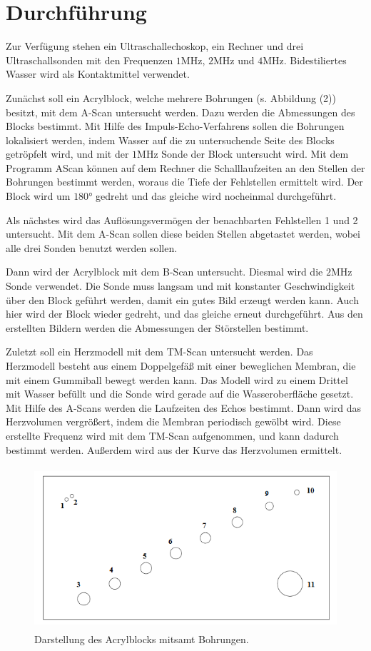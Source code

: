 \section{Durchführung}
\label{sec:Durchführung}

Zur Verfügung stehen ein Ultraschallechoskop, ein Rechner und drei Ultraschallsonden mit den Frequenzen $1 \si{\mega\hertz}$, $2 \si{\mega\hertz}$ und $4 \si{\mega\hertz}$.
Bidestiliertes Wasser wird als Kontaktmittel verwendet. 


\noindent Zunächst soll ein Acrylblock, welche mehrere Bohrungen (s. Abbildung (2)) besitzt, mit dem A-Scan untersucht werden. Dazu werden die Abmessungen des Blocks bestimmt.
Mit Hilfe des Impuls-Echo-Verfahrens sollen die Bohrungen lokalisiert werden, indem Wasser auf die zu untersuchende Seite des Blocks getröpfelt wird, und mit der $1 \si{\mega\hertz}$ Sonde der Block untersucht wird.
Mit dem Programm AScan können auf dem Rechner die Schalllaufzeiten an den Stellen der Bohrungen bestimmt werden, woraus die Tiefe der Fehlstellen ermittelt wird.
Der Block wird um $180°$ gedreht und das gleiche wird nocheinmal durchgeführt.

\noindent Als nächstes wird das Auflösungsvermögen der benachbarten Fehlstellen 1 und 2 untersucht. Mit dem A-Scan sollen diese beiden Stellen abgetastet werden, wobei alle drei Sonden benutzt werden sollen.


\noindent Dann wird der Acrylblock mit dem B-Scan untersucht. Diesmal wird die $2 \si{\mega\hertz}$ Sonde verwendet. Die Sonde muss langsam und mit konstanter Geschwindigkeit über den Block geführt werden, damit ein gutes Bild erzeugt werden kann.
Auch hier wird der Block wieder gedreht, und das gleiche erneut durchgeführt. Aus den erstellten Bildern werden die Abmessungen der Störstellen bestimmt.


\noindent Zuletzt soll ein Herzmodell mit dem TM-Scan untersucht werden. Das Herzmodell besteht aus einem Doppelgefäß mit einer beweglichen Membran, die mit einem Gummiball bewegt werden kann.
Das Modell wird zu einem Drittel mit Wasser befüllt und die Sonde wird gerade auf die Wasseroberfläche gesetzt. Mit Hilfe des A-Scans werden die Laufzeiten des Echos bestimmt.
Dann wird das Herzvolumen vergrößert, indem die Membran periodisch gewölbt wird.
Diese erstellte Frequenz wird mit dem TM-Scan aufgenommen, und kann dadurch bestimmt werden. Außerdem wird aus der Kurve das Herzvolumen ermittelt.
\begin{figure}[H]
  \centering
  \includegraphics[height=6cm]{acryl.png}
  \caption{Darstellung des Acrylblocks mitsamt Bohrungen. \cite[S.4]{kent}}
\end{figure}